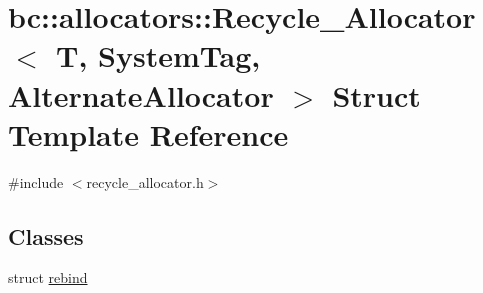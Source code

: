 \hypertarget{structbc_1_1allocators_1_1Recycle__Allocator}{}\section{bc\+:\+:allocators\+:\+:Recycle\+\_\+\+Allocator$<$ T, System\+Tag, Alternate\+Allocator $>$ Struct Template Reference}
\label{structbc_1_1allocators_1_1Recycle__Allocator}


{\ttfamily \#include $<$recycle\+\_\+allocator.\+h$>$}

\subsection*{Classes}
\begin{DoxyCompactItemize}
\item 
struct \hyperlink{structbc_1_1allocators_1_1Recycle__Allocator_1_1rebind}{rebind}
\end{DoxyCompactItemize}
